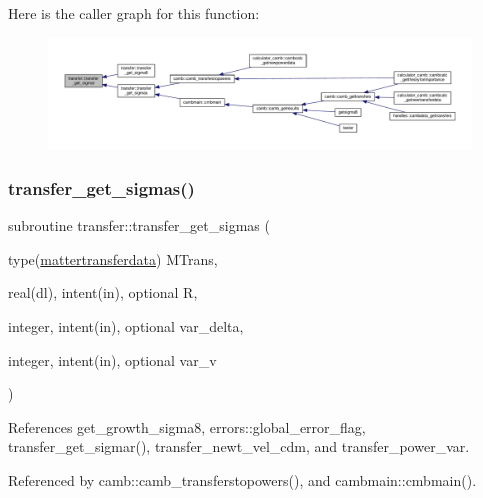 Here is the caller graph for this function\+:
\nopagebreak
\begin{figure}[H]
\begin{center}
\leavevmode
\includegraphics[width=350pt]{namespacetransfer_a0b068265a029b16713e45ff26d8e6794_icgraph}
\end{center}
\end{figure}
\mbox{\label{namespacetransfer_a94b4673ba4b74ac5aef785afde714446}} 
\subsubsection{\texorpdfstring{transfer\+\_\+get\+\_\+sigmas()}{transfer\_get\_sigmas()}}
{\footnotesize\ttfamily subroutine transfer\+::transfer\+\_\+get\+\_\+sigmas (\begin{DoxyParamCaption}\item[{type(\mbox{\hyperlink{structtransfer_1_1mattertransferdata}{mattertransferdata}})}]{M\+Trans,  }\item[{real(dl), intent(in), optional}]{R,  }\item[{integer, intent(in), optional}]{var\+\_\+delta,  }\item[{integer, intent(in), optional}]{var\+\_\+v }\end{DoxyParamCaption})}



References get\+\_\+growth\+\_\+sigma8, errors\+::global\+\_\+error\+\_\+flag, transfer\+\_\+get\+\_\+sigmar(), transfer\+\_\+newt\+\_\+vel\+\_\+cdm, and transfer\+\_\+power\+\_\+var.



Referenced by camb\+::camb\+\_\+transferstopowers(), and cambmain\+::cmbmain().

